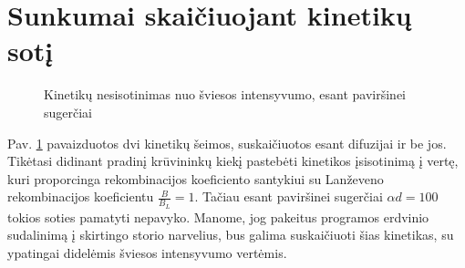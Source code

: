  
\section{Sunkumai skaičiuojant kinetikų sotį}
\label{app:rekombinacija}

\begin{figure}[h]
  \centering
{}
  \caption{Kinetikų nesisotinimas nuo šviesos intensyvumo, esant paviršinei sugerčiai}
  \label{fig:nosatur}
\end{figure}

Pav. \ref{fig:nosatur} pavaizduotos dvi kinetikų šeimos, suskaičiuotos esant difuzijai ir be jos. Tikėtasi didinant pradinį krūvininkų kiekį pastebėti kinetikos įsisotinimą į vertę, kuri proporcinga rekombinacijos koeficiento santykiui su Lanževeno rekombinacijos koeficientu \(\frac{B}{B_L} = 1\). Tačiau esant paviršinei sugerčiai \(\alpha d = 100\) tokios soties pamatyti nepavyko. Manome, jog pakeitus programos erdvinio sudalinimą į skirtingo storio narvelius, bus galima suskaičiuoti šias kinetikas, su ypatingai didelėmis šviesos intensyvumo vertėmis.